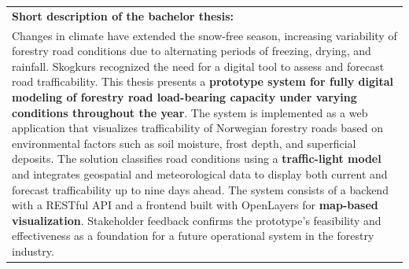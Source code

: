 \begin{table}[ht]
\begin{tabularx}{\textwidth}{|X|X|X|}
    \multicolumn{3}{|l|}{\textbf{Short description of the bachelor thesis:}} \\
    \multicolumn{3}{|p{0.96\textwidth}|}{
    Changes in climate have extended the snow-free season, increasing variability of forestry road conditions due to alternating periods of freezing, drying, and rainfall. Skogkurs recognized the need for a digital tool to assess and forecast road trafficability. This thesis presents a \textbf{prototype system for fully digital modeling of forestry road load-bearing capacity under varying conditions throughout the year}. The system is implemented as a web application that visualizes trafficability of Norwegian forestry roads based on environmental factors such as soil moisture, frost depth, and superficial deposits. The solution classifies road conditions using a \textbf{traffic-light model} and integrates geospatial and meteorological data to display both current and forecast trafficability up to nine days ahead. The system consists of a backend with a RESTful API and a frontend built with OpenLayers for \textbf{map-based visualization}. Stakeholder feedback confirms the prototype's feasibility and effectiveness as a foundation for a future operational system in the forestry industry. 
    } \\ \hline
    \end{tabularx}
\end{table}
